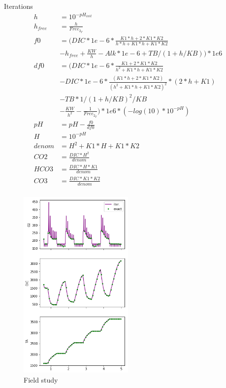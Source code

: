 \documentclass{ruthesis}
\begin{document}
Iterations
\begin{align*}
h 			&=  10^{-pH_{init}}	\nonumber                              \\
h_{free} 	&=  \frac{h}{Free_{2_T}}	 \nonumber \\
f0 			&= (  DIC*1e-6*\frac{K1*h+2*K1*K2}{h*h+K1*h+K1*K2}    \nonumber\\
			&  - h_{free} + \frac{KW}{h} - Alk*1e-6 +TB  /(1+h/KB) )*1e6 \nonumber  \\
df0 		&= (  DIC*1e-6*\frac{K1 +2*K1*K2}{h^2+K1*h+K1*K2}  \nonumber\\
			&  -DIC*1e-6*\frac{(K1*h+2*K1*K2)}{(h^2+K1*h+K1*K2)^2}*(2*h+K1)  \nonumber\\
			&  -TB *1/(1+h/KB)^2 / KB             \nonumber             \\
			&  -\frac{KW}{h^2} - \frac{1}{Free_{2_T}} )*1e6  * (-log(10)*10^{-pH}) \nonumber \\
pH 			&= pH - \frac{f0}{df0} \nonumber                              \\
H 			&= 10^{-pH} \nonumber                              \\
denom 		&= H^2+K1*H+K1*K2 \nonumber                              \\
CO2  		&= \frac{DIC*H^2}{denom} \nonumber                              \\
HCO3 		&= \frac{DIC*H *K1}{denom} \nonumber                              \\
CO3  		&= \frac{DIC*K1*K2}{denom}      \nonumber \\                         
\end{align*}




\begin{figure}
	\centerline{\includegraphics[width=0.5\textwidth]{images_microalgae/plots/iterative_states}}
	\caption[.]{Field study}
	\label{fig:iterative_states}
\end{figure}
\end{document}
